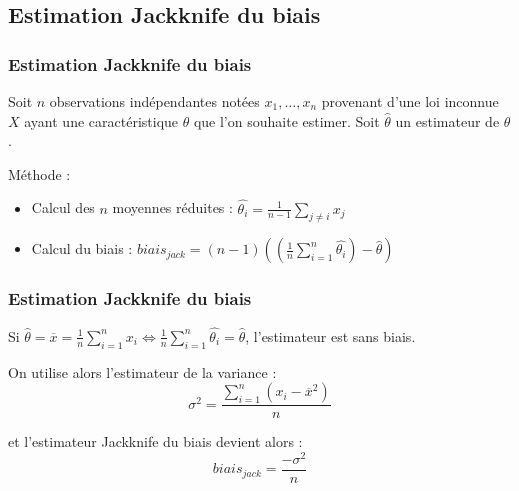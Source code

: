 \documentclass[handout]{beamer}
\begin{document}
		\subsection{Estimation Jackknife du biais}
		\begin{frame}
			\frametitle{Estimation Jackknife du biais}
			Soit $n$ observations indépendantes notées $x_1, \dots, x_n$ provenant d'une loi inconnue $X$ ayant une caractéristique $\theta$ que l'on souhaite estimer. Soit $\hat{\theta}$ un estimateur de $\theta$.

			\vspace{15px}
			Méthode :
			\begin{itemize}
				\item Calcul des $n$ moyennes réduites : $\hat{\theta_i} = \frac{1}{n - 1}\sum\limits_{j \neq i } x_j$
				\item Calcul du biais : $biais_{jack} = (n - 1)((\frac{1}{n} \sum\limits_{i=1}^n \hat{\theta_i}) - \hat{\theta})$
			\end{itemize}


		\end{frame}

		\begin{frame}
			\frametitle{Estimation Jackknife du biais}
			Si $\hat{\theta} = \overline{x} = \frac{1}{n} \sum\limits_{i=1}^n x_i \Leftrightarrow \frac{1}{n} \sum\limits_{i=1}^n \hat{\theta_i} = \hat{\theta}$, l'estimateur est sans biais.

			\vspace{15px}
			On utilise alors l'estimateur de la variance :
			\[\sigma^2 = \frac{\sum\limits_{i=1}^n (x_i - \overline{x}^2)}{n} \]

			et l'estimateur Jackknife du biais devient alors :
			\[biais_{jack} = \frac{-\sigma^2}{n} \]
		\end{frame}


\end{document}
